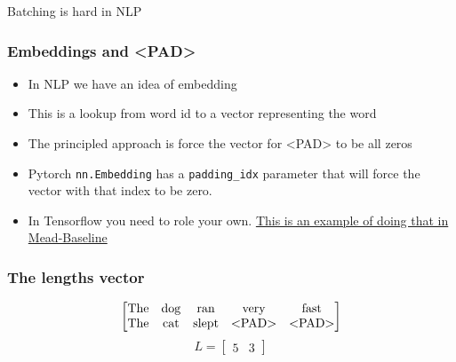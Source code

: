 \documentclass{beamer}
\begin{document}
\begin{section}{Batching is hard in NLP}
    \begin{frame}
        \frametitle{Embeddings and \textless PAD\textgreater}
        \begin{itemize}
            \item In NLP we have an idea of embedding
            \item This is a lookup from word id to a vector representing the word
            \item The principled approach is force the vector for \textless PAD\textgreater \hspace{1pt} to be all zeros
            \item Pytorch \texttt{nn.Embedding} has a \texttt{padding\_idx} parameter that will force the vector with
                    that index to be zero.
            \item In Tensorflow you need to role your own.
                \href{https://github.com/dpressel/mead-baseline/blob/f98e64afcbab8a267fce5d13a434a981aa564d27/python/baseline/tf/tfy.py\#L656}{This is an example of doing that in Mead-Baseline}
        \end{itemize}
    \end{frame}

    \begin{frame}
        \frametitle{The lengths vector}

        $$
            \begin{bmatrix}
                \text{The} & \text{dog} & \text{ran} & \text{very} & \text{fast} \\
                \text{The} & \text{cat} & \text{slept} & \text{\textless PAD\textgreater} & \text{\textless PAD\textgreater}
            \end{bmatrix}
        $$
        $$
            L = \begin{bmatrix} 5 & 3 \end{bmatrix}
        $$


\end{frame}
\end{section}
\end{document}
